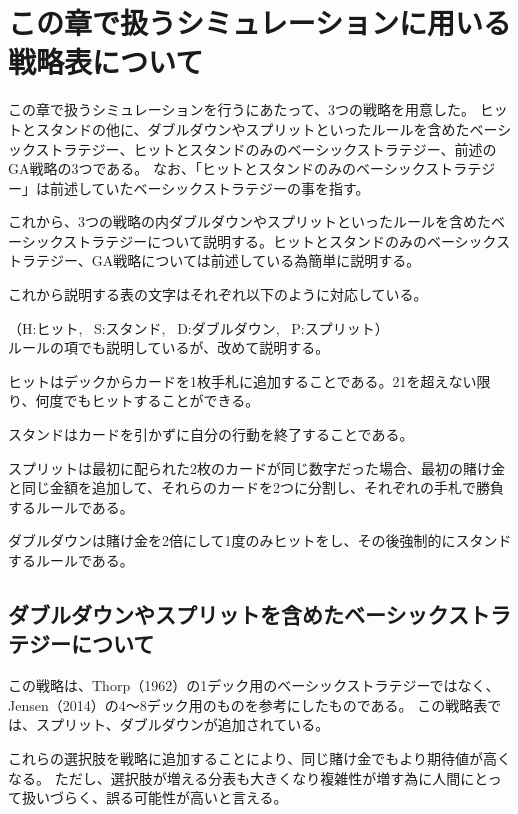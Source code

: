 \section{この章で扱うシミュレーションに用いる戦略表について}
この章で扱うシミュレーションを行うにあたって、3つの戦略を用意した。
ヒットとスタンドの他に、ダブルダウンやスプリットといったルールを含めたベーシックストラテジー、ヒットとスタンドのみのベーシックストラテジー、前述のGA戦略の3つである。
なお、「ヒットとスタンドのみのベーシックストラテジー」は前述していたベーシックストラテジーの事を指す。

これから、3つの戦略の内ダブルダウンやスプリットといったルールを含めたベーシックストラテジーについて説明する。ヒットとスタンドのみのベーシックストラテジー、GA戦略については前述している為簡単に説明する。

これから説明する表の文字はそれぞれ以下のように対応している。

（H:ヒット, \ S:スタンド, \ D:ダブルダウン, \ P:スプリット）  
\\

ルールの項でも説明しているが、改めて説明する。

ヒットはデックからカードを1枚手札に追加することである。21を超えない限り、何度でもヒットすることができる。

スタンドはカードを引かずに自分の行動を終了することである。

スプリットは最初に配られた2枚のカードが同じ数字だった場合、最初の賭け金と同じ金額を追加して、それらのカードを2つに分割し、それぞれの手札で勝負するルールである。

ダブルダウンは賭け金を2倍にして1度のみヒットをし、その後強制的にスタンドするルールである。



\subsection{ダブルダウンやスプリットを含めたベーシックストラテジーについて}

この戦略は、Thorp（1962）の1デック用のベーシックストラテジーではなく、Jensen（2014）の4～8デック用のものを参考にしたものである。
この戦略表では、スプリット、ダブルダウンが追加されている。

これらの選択肢を戦略に追加することにより、同じ賭け金でもより期待値が高くなる。
ただし、選択肢が増える分表も大きくなり複雑性が増す為に人間にとって扱いづらく、誤る可能性が高いと言える。

